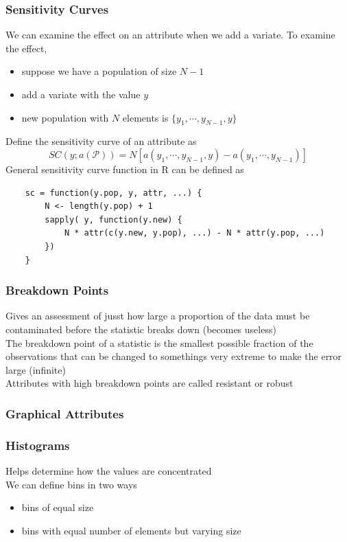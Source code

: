 \documentclass[11pt]{article}
\begin{document}
\subsubsection*{Sensitivity Curves}   
We can examine the effect on an attribute when we add a variate. To examine the effect,
\begin{itemize}
    \item suppose we have a population of size $N-1$ 
    \item add a variate with the value $y$
    \item new population with $N$ elements is $\{y_1,\cdots,y_{N-1},y\}$
\end{itemize}
Define the sensitivity curve of an attribute as 
\[SC(y;a(\mathcal{P})) = N[a(y_1,\cdots,y_{N-1},y)-a(y_1,\cdots,y_{N-1})]\]
General sensitivity curve function in R can be defined as 
\begin{verbatim}
    sc = function(y.pop, y, attr, ...) {
        N <- length(y.pop) + 1
        sapply( y, function(y.new) {
            N * attr(c(y.new, y.pop), ...) - N * attr(y.pop, ...)
        })
    }
\end{verbatim}
\subsubsection*{Breakdown Points}
Gives an assessment of jusst how large a proportion of the data must be contaminated before the statistic breaks down (becomes useless) \\
The breakdown point of a statistic is the smallest possible fraction of the observations that can be changed to somethings very extreme to make the error large (infinite) \\
Attributes with high breakdown points are called resistant or robust 
\subsubsection{Graphical Attributes}
\subsubsection*{Histograms}
Helps determine how the values are concentrated \\
We can define bins in two ways 
\begin{itemize}
    \item bins of equal size 
    \item bins with equal number of elements but varying size 
\end{itemize}
\end{document}
